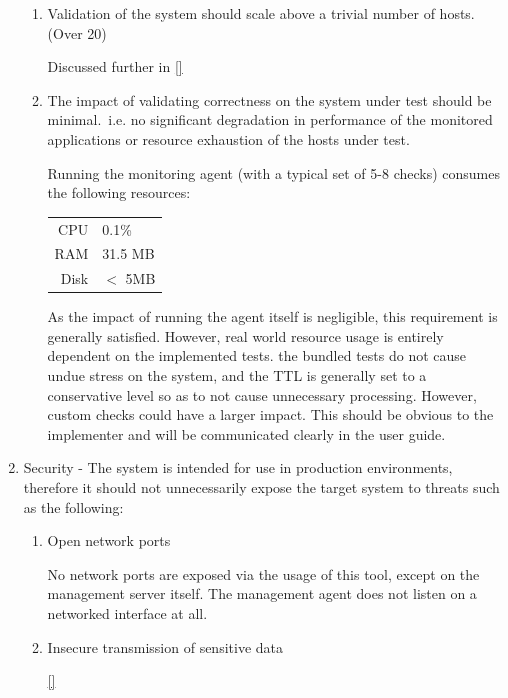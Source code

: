 \documentclass{cshonours}
\begin{document}
\begin{enumerate}
\begin{enumerate}
      \item Validation of the system should scale above a trivial number of hosts. (Over 20)

        Discussed further in \ref{}

      \item The impact of validating correctness on the system under test should be minimal.\ i.e. no significant degradation in performance of the monitored applications or resource exhaustion of the hosts under test.

        Running the monitoring agent (with a typical set of 5-8 checks) consumes the following resources:
        
        \begin{table}[htbp]
          \centering
        \begin{tabular}{|r|l|}
          CPU & 0.1\% \\
          RAM & 31.5 MB \\
          Disk & $<$ 5MB \\
        \end{tabular}
        \end{table}

        As the impact of running the agent itself is negligible, this requirement is generally satisfied. However, real world resource usage is entirely dependent on the implemented tests. the bundled tests do not cause undue stress on the system, and the TTL is generally set to a conservative level so as to not cause unnecessary processing. However, custom checks could have a larger impact. This should be obvious to the implementer and will be communicated clearly in the user guide.

    \end{enumerate}
  \item Security - The system is intended for use in production environments, therefore it should not unnecessarily expose the target system to threats such as the following:
    \begin{enumerate}
      \item Open network ports

        No network ports are exposed via the usage of this tool, except on the management server itself. The management agent does not listen on a networked interface at all.

      \item Insecure transmission of sensitive data

        \ref{}


\end{enumerate}
\end{enumerate}
\end{document}

